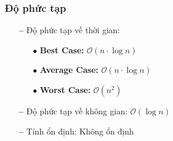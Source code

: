 \subsubsection{Độ phức tạp}
\begin{itemize}
    \item[\textbf{--}]Độ phức tạp về thời gian:
        \begin{itemize}
            \item[$\bullet$] \textbf{Best Case:} $\mathcal{O}(n \cdot \log{}n)$ 
            \item[$\bullet$] \textbf{Average Case:}  $\mathcal{O}(n \cdot \log{}n)$
            \item[$\bullet$] \textbf{Worst Case:}  $\mathcal{O}(n^{2})$
        \end{itemize}
    \item[\textbf{--}]Độ phức tạp về không gian: $\mathcal{O}(\log{n})$ 
    \item[\textbf{--}]Tính ổn định: Không ổn định
\end{itemize}

